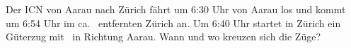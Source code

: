 Der ICN von Aarau nach Zürich fährt um 6:30 Uhr von Aarau los und kommt um 6:54 Uhr im ca. \sAZO\ entfernten Zürich an. Um 6:40 Uhr startet in Zürich ein Güterzug mit \vGO\ in Richtung Aarau. Wann und wo kreuzen sich die Züge?
